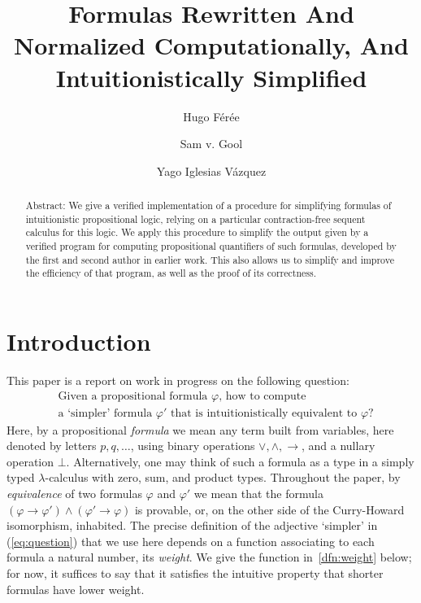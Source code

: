 \documentclass[english,review]{jflart}
\title{Formulas Rewritten And Normalized Computationally, And Intuitionistically Simplified}
\author[1]{Hugo Férée}
\author[1]{Sam v. Gool}
\author[1]{Yago Iglesias Vázquez}
\affil[1]{IRIF, Université Paris Cité, Paris, 75013, France}
\theoremstyle{definition}
\theoremstyle{plain}
\renewcommand{\phi}{\varphi}
\begin{document}
\maketitle

\begin{abstract}
Abstract: We give a verified implementation of a procedure for simplifying formulas of  intuitionistic propositional logic, relying on a particular contraction-free sequent calculus for this logic. We apply this procedure to simplify the output given by a verified program for computing propositional quantifiers of such formulas, developed by the first and second author in earlier work. This also allows us to simplify and improve the efficiency of that program, as well as the proof of its correctness.
\end{abstract}

\section{Introduction}

This paper is a report on work in progress on the following question: 
\begin{equation}\label{eq:question}
\begin{aligned}
&\text{Given a propositional formula $\phi$, how to compute } \\
&\text{a `simpler' formula $\phi'$ that is intuitionistically equivalent to $\phi$?}
\end{aligned}
\end{equation}
Here, by a propositional \emph{formula} we mean any term built from variables, here denoted by letters $p, q, \dots$, using binary operations $\vee, \wedge, \to$, and a nullary operation $\bot$. Alternatively, one may think of such a formula as a type in a simply typed $\lambda$-calculus with zero, sum, and product types. Throughout the paper, by \emph{equivalence} of two formulas $\phi$ and $\phi'$ we mean that the formula $(\phi \to \phi') \wedge (\phi' \to \phi)$ is provable, or, on the other side of the Curry-Howard isomorphism, inhabited. The precise definition of the adjective `simpler' in (\ref{eq:question}) that we use here depends on a function associating to each formula a natural number, its \emph{weight}. We give the function in~\cref{dfn:weight} below; for now, it suffices to say that it satisfies the intuitive property that shorter formulas have lower weight.
\end{document}
